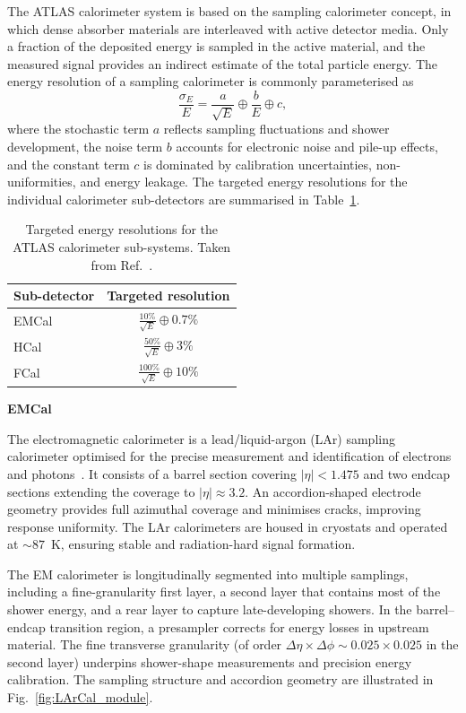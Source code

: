 The ATLAS calorimeter system is based on the sampling calorimeter concept, in which dense absorber materials are interleaved with active detector media.
Only a fraction of the deposited energy is sampled in the active material, and the measured signal provides an indirect estimate of the total particle energy.
The energy resolution of a sampling calorimeter is commonly parameterised as
\begin{equation}
    \frac{\sigma_E}{E} = \frac{a}{\sqrt{E}} \oplus \frac{b}{E} \oplus c,
\end{equation}
where the stochastic term $a$ reflects sampling fluctuations and shower development, the noise term $b$ accounts for electronic noise and pile-up effects, and the constant term $c$ is dominated by calibration uncertainties, non-uniformities, and energy leakage.
The targeted energy resolutions for the individual calorimeter sub-detectors are summarised in Table~\ref{tab:calorimeter_resolution}.

\begin{table}[htbp]
    \centering
    \caption{Targeted energy resolutions for the ATLAS calorimeter sub-systems. Taken from Ref.~\cite{ATLASJINST2008}.}
    \begin{tabular}{lc}
        \hline
        Sub-detector & Targeted resolution \\
        \hline
        EMCal & $\frac{10\%}{\sqrt{E}} \oplus 0.7\%$ \\
        HCal & $\frac{50\%}{\sqrt{E}} \oplus 3\%$ \\
        FCal & $\frac{100\%}{\sqrt{E}} \oplus 10\%$ \\
        \hline
    \end{tabular}
    \label{tab:calorimeter_resolution}
\end{table}

\textbf{EMCal}

The electromagnetic calorimeter is a lead/liquid-argon (LAr) sampling calorimeter optimised for the precise measurement and identification of electrons and photons~\cite{ATLASCalorimeterTDR,ATLASJINST2008}.
It consists of a barrel section covering $|\eta| < 1.475$ and two endcap sections extending the coverage to $|\eta| \approx 3.2$.
An accordion-shaped electrode geometry provides full azimuthal coverage and minimises cracks, improving response uniformity.
The LAr calorimeters are housed in cryostats and operated at $\sim 87$~K, ensuring stable and radiation-hard signal formation.

The EM calorimeter is longitudinally segmented into multiple samplings, including a fine-granularity first layer, a second layer that contains most of the shower energy, and a rear layer to capture late-developing showers.
In the barrel--endcap transition region, a presampler corrects for energy losses in upstream material.
The fine transverse granularity (of order $\Delta\eta \times \Delta\phi \sim 0.025 \times 0.025$ in the second layer) underpins shower-shape measurements and precision energy calibration.
The sampling structure and accordion geometry are illustrated in Fig.~\ref{fig:LArCal_module}.

